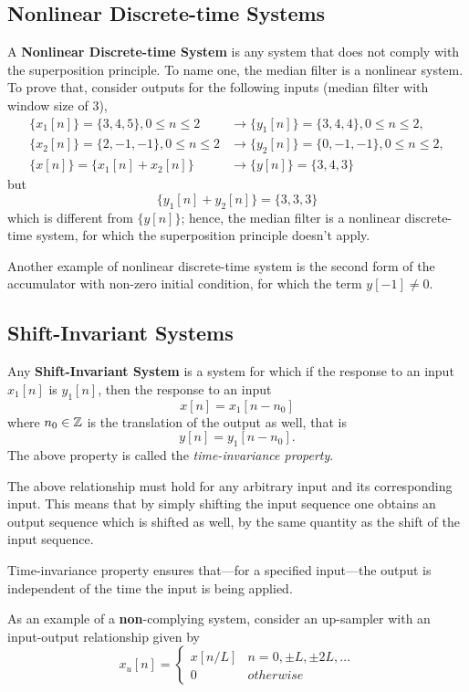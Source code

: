 \documentclass[\documentfontsize, twocolumn]{\classname}
\begin{document}
\subsection{Nonlinear Discrete-time Systems}

A \textbf{Nonlinear Discrete-time System} is any system that does not comply with the superposition principle. To name one, the median filter is a nonlinear system. To prove that, consider outputs for the following inputs (median filter with window size of $3$),
\begin{align*}
    \{x_1[n]\} = \{3,4,5\}, 0 \leq n \leq 2 &\longrightarrow \{y_1[n]\}=\{3,4,4\}, 0 \leq n \leq 2,\\
    \{x_2[n]\} = \{2,-1,-1\}, 0 \leq n \leq 2 &\longrightarrow \{y_2[n]\}=\{0,-1,-1\}, 0 \leq n \leq 2,\\
    \{x[n]\} = \{x_1[n] + x_2[n]\} &\longrightarrow \{y[n]\}=\{3,4,3\}
\end{align*}
but
\[\{y_1[n] + y_2[n]\} = \{3, 3, 3\}\]
which is different from $\{y[n]\}$; hence, the median filter is a nonlinear discrete-time system, for which the superposition principle doesn't apply.

Another example of nonlinear discrete-time system is the second form of the accumulator with non-zero initial condition, for which the term $y[-1] \neq 0$.

\subsection{Shift-Invariant Systems}

Any \textbf{Shift-Invariant System} is a system for which if the response to an input $x_1[n]$ is $y_1[n]$, then the response to an input \[x[n] = x_1[n-n_0]\] where $n_0 \in \mathbb Z$ is the translation of the output as well, that is \[y[n] = y_1[n-n_0].\] The above property is called the \emph{time-invariance property}.

The above relationship must hold for any arbitrary input and its corresponding input. This means that by simply shifting the input sequence one obtains an output sequence which is shifted as well, by the same quantity as the shift of the input sequence.

Time-invariance property ensures that---for a specified input---the output is independent of the time the input is being applied.

As an example of a \textbf{non}-complying system, consider an up-sampler with an input-output relationship given by
\[
	x_u[n] =
	\left\{
		\begin{array}{ll}
			x[n/L] 	& n=0,\pm L, \pm 2L, \dots \\
			0 	& otherwise
		\end{array}
	\right.
\]
\end{document}
